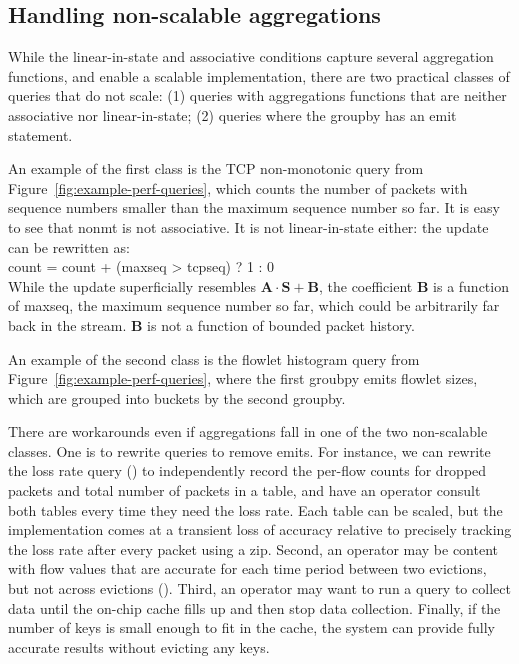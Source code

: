 \subsection{Handling non-scalable aggregations}
\label{sec:workaround-nonscalable}
While the linear-in-state and associative conditions capture several aggregation
functions, and enable a scalable implementation, there are two practical classes
of queries that do not scale: (1) queries with aggregations
functions that are neither associative nor linear-in-state; (2) queries where
the groupby has an {\ct emit} statement.

An example of the first class is the TCP non-monotonic query from
Figure~\ref{fig:example-perf-queries}, which counts the number of packets
with sequence numbers smaller than the maximum sequence number so far. It is
easy to see that {\ct nonmt} is not associative. It is not linear-in-state
either: the update can be rewritten as:
\\
%
{\ct count = count + (maxseq > tcpseq) ? 1 : 0}\\
%
While the update superficially resembles $\boldsymbol{A}
\cdot \boldsymbol{S} + \boldsymbol{B}$, the coefficient $\boldsymbol{B}$ is a
function of {\ct maxseq}, \ie the maximum sequence number so far, which
could be arbitrarily far back in the stream.
$\boldsymbol{B}$ is not a function of bounded packet history.

An example of the second class is the flowlet histogram query from
Figure~\ref{fig:example-perf-queries}, where the first {\ct groubpy} emits
flowlet sizes, which are grouped into buckets by the second {\ct groupby}.

There are workarounds even if aggregations fall in one of the two
non-scalable classes. One is to 
rewrite queries to remove {\ct emit}s.
For instance, we can rewrite the loss rate query
() to independently record the per-flow
counts for dropped packets and total number of packets in a table, and
have an operator consult both tables every time they need the loss rate. Each
table can be scaled,
but the implementation comes at a transient loss of accuracy
relative to precisely 
tracking the loss rate after every packet using a {\ct zip.}  Second, an
operator may be content
with flow values that are accurate for each time period between two evictions,
but not across evictions (). Third, an operator
may want to run a query to collect data until the on-chip cache fills up and
then stop data collection. Finally, if the number of keys is small enough to fit
in the cache, the system can provide fully accurate results without evicting any
keys.

